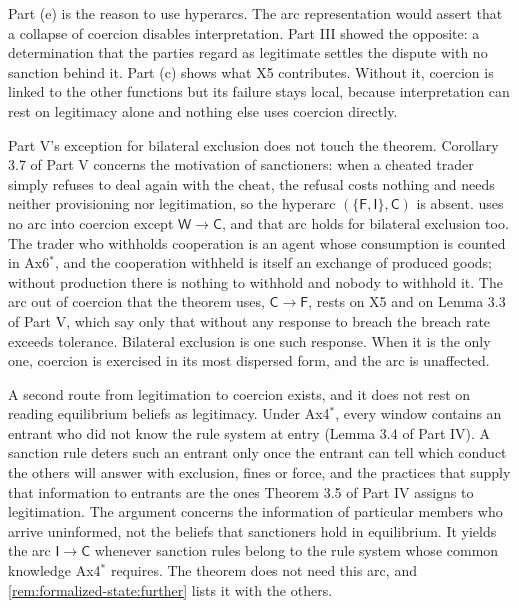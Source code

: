 \documentclass[11pt,letterpaper]{article}
\theoremstyle{definition}
\theoremstyle{remark}
\newcommand{\pF}{\mathsf{F}}
\newcommand{\pI}{\mathsf{I}}
\newcommand{\pC}{\mathsf{C}}
\newcommand{\pW}{\mathsf{W}}
\begin{document}
Part (e) is the reason to use hyperarcs. The arc representation would assert that a collapse of coercion disables interpretation. Part III showed the opposite: a determination that the parties regard as legitimate settles the dispute with no sanction behind it. Part (c) shows what X5 contributes. Without it, coercion is linked to the other functions but its failure stays local, because interpretation can rest on legitimacy alone and nothing else uses coercion directly.

Part V's exception for bilateral exclusion does not touch the theorem. Corollary 3.7 of Part V concerns the motivation of sanctioners: when a cheated trader simply refuses to deal again with the cheat, the refusal costs nothing and needs neither provisioning nor legitimation, so the hyperarc $(\{\pF,\pI\},\pC)$ is absent.  uses no arc into coercion except $\pW\to\pC$, and that arc holds for bilateral exclusion too. The trader who withholds cooperation is an agent whose consumption is counted in Ax6$^{*}$, and the cooperation withheld is itself an exchange of produced goods; without production there is nothing to withhold and nobody to withhold it. The arc out of coercion that the theorem uses, $\pC\to\pF$, rests on X5 and on Lemma 3.3 of Part V, which say only that without any response to breach the breach rate exceeds tolerance. Bilateral exclusion is one such response. When it is the only one, coercion is exercised in its most dispersed form, and the arc is unaffected.

A second route from legitimation to coercion exists, and it does not rest on reading equilibrium beliefs as legitimacy. Under Ax4$^{*}$, every window contains an entrant who did not know the rule system at entry (Lemma 3.4 of Part IV). A sanction rule deters such an entrant only once the entrant can tell which conduct the others will answer with exclusion, fines or force, and the practices that supply that information to entrants are the ones Theorem 3.5 of Part IV assigns to legitimation. The argument concerns the information of particular members who arrive uninformed, not the beliefs that sanctioners hold in equilibrium. It yields the arc $\pI\to\pC$ whenever sanction rules belong to the rule system whose common knowledge Ax4$^{*}$ requires. The theorem does not need this arc, and \cref{rem:formalized-state:further} lists it with the others.
\end{document}
